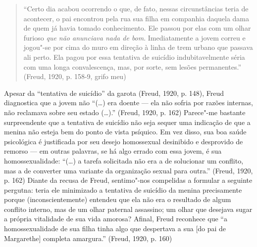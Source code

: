 \begin{quote}
``Certo dia acabou ocorrendo o que, de fato, nessas circunstâncias teria
de acontecer, o pai encontrou pela rua sua filha em companhia daquela
dama de quem já havia tomado conhecimento. Ele passou por elas com um
olhar furioso \emph{que não anunciava nada de bom}. Imediatamente a
jovem correu e jogou"-se por cima do muro em direção à linha de trem
urbano que passava ali perto. Ela pagou por essa tentativa de suicídio
indubitavelmente séria com uma longa convalescença, mas, por sorte, sem
lesões permanentes.'' (Freud, 1920, p. 158-9, grifo meu)
\end{quote}

Apesar da ``tentativa de suicídio'' da garota (Freud, 1920, p. 148),
Freud diagnostica que a jovem não ``(\ldots{}) era doente --- ela não
sofria por razões internas, não reclamava sobre seu estado (\ldots{}).''
(Freud, 1920, p. 162) Parece"-me bastante surpreendente que a tentativa
de suicídio não seja sequer uma indicação de que a menina não esteja bem
do ponto de vista psíquico. Em vez disso, sua boa saúde psicológica é
justificada por seu desejo homossexual desinibido e desprovido de
remorso --- em outras palavras, se há algo errado com essa jovem, é sua
homossexualidade: ``(\ldots{}) a tarefa solicitada não era a de
solucionar um conflito, mas a de converter uma variante da organização
sexual para outra.'' (Freud, 1920, p. 162) Diante da recusa de Freud,
sentimo"-nos compelidas a formular a seguinte pergutna: teria ele
minimizado a tentativa de suicídio da menina precisamente porque
(inconscientemente) entendeu que ela não era o resultado de algum
conflito interno, mas de um olhar paternal assassino; um olhar que
desejava sugar a própria vitalidade de sua vida amorosa? Afinal, Freud
reconhece que ``a homossexualidade de sua filha tinha algo que
despertava a sua {[}do pai de Margarethe{]} completa amargura.'' (Freud,
1920, p. 160)

